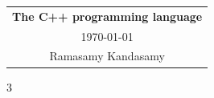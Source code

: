 



\raggedright
\footnotesize
\begin{center}
\begin{tabular}{c}
\Large{\textbf{The C++ programming language}}\\
\today\\
Ramasamy Kandasamy\\
\end{tabular}
\end{center}

\begin{multicols*}{3}
\setlength{\premulticols}{1pt}
\setlength{\postmulticols}{1pt}
\setlength{\multicolsep}{1pt}
\setlength{\columnsep}{2pt}


\begingroup
  \normalsize                 %
  \setcounter{tocdepth}{2}    %
  \tableofcontents
\endgroup
\clearpage                    %



















\vfill\null\pagebreak


% 
% 

\end{multicols*}

